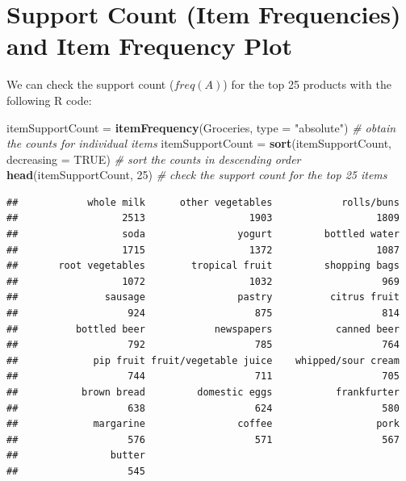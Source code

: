 \documentclass[
]{book}
\newenvironment{Shaded}{\begin{snugshade}}{\end{snugshade}}
\newcommand{\CommentTok}[1]{\textcolor[rgb]{0.56,0.35,0.01}{\textit{#1}}}
\newcommand{\DataTypeTok}[1]{\textcolor[rgb]{0.13,0.29,0.53}{#1}}
\newcommand{\DecValTok}[1]{\textcolor[rgb]{0.00,0.00,0.81}{#1}}
\newcommand{\KeywordTok}[1]{\textcolor[rgb]{0.13,0.29,0.53}{\textbf{#1}}}
\newcommand{\NormalTok}[1]{#1}
\newcommand{\OtherTok}[1]{\textcolor[rgb]{0.56,0.35,0.01}{#1}}
\newcommand{\StringTok}[1]{\textcolor[rgb]{0.31,0.60,0.02}{#1}}
\begin{document}
\hypertarget{support-count-item-frequencies-and-item-frequency-plot}{%
\section{Support Count (Item Frequencies) and Item Frequency Plot}\label{support-count-item-frequencies-and-item-frequency-plot}}

We can check the support count (\(freq(A)\)) for the top 25 products with the following R code:

\begin{Shaded}
\begin{Highlighting}[]
\NormalTok{itemSupportCount =}\StringTok{ }\KeywordTok{itemFrequency}\NormalTok{(Groceries, }\DataTypeTok{type =} \StringTok{"absolute"}\NormalTok{) }\CommentTok{# obtain the counts for individual items}
\NormalTok{itemSupportCount =}\StringTok{ }\KeywordTok{sort}\NormalTok{(itemSupportCount, }\DataTypeTok{decreasing =} \OtherTok{TRUE}\NormalTok{) }\CommentTok{# sort the counts in descending order}
\KeywordTok{head}\NormalTok{(itemSupportCount, }\DecValTok{25}\NormalTok{) }\CommentTok{# check the support count for the top 25 items}
\end{Highlighting}
\end{Shaded}

\begin{verbatim}
##            whole milk      other vegetables            rolls/buns 
##                  2513                  1903                  1809 
##                  soda                yogurt         bottled water 
##                  1715                  1372                  1087 
##       root vegetables        tropical fruit         shopping bags 
##                  1072                  1032                   969 
##               sausage                pastry          citrus fruit 
##                   924                   875                   814 
##          bottled beer            newspapers           canned beer 
##                   792                   785                   764 
##             pip fruit fruit/vegetable juice    whipped/sour cream 
##                   744                   711                   705 
##           brown bread         domestic eggs           frankfurter 
##                   638                   624                   580 
##             margarine                coffee                  pork 
##                   576                   571                   567 
##                butter 
##                   545
\end{verbatim}
\end{document}
